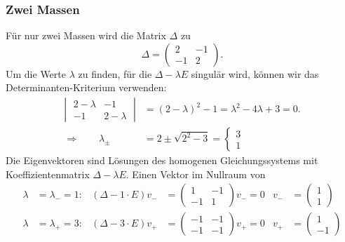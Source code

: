 \subsubsection{Zwei Massen}
Für nur zwei Massen wird die Matrix $\Delta$ zu
\[
\Delta=\begin{pmatrix}
2&-1\\
-1&2
\end{pmatrix}.
\]
Um die Werte $\lambda$ zu finden, für die $\Delta-\lambda E$ singulär
wird, können wir das Determinanten-Kriterium verwenden:
\begin{align*}
\left|\;\begin{matrix}
2-\lambda&-1\\-1&2-\lambda
\end{matrix}\;\right|
&=(2-\lambda)^2-1=\lambda^2 -4\lambda+3=0.
\\
\Rightarrow\qquad
\lambda_{\pm}&=2\pm\sqrt{2^2-3}=\begin{cases}3\\1\end{cases}
\end{align*}
Die Eigenvektoren sind Lösungen des homogenen Gleichungssystems mit
Koeffizientenmatrix $\Delta-\lambda E$.
Einen Vektor im Nullraum
von
\begin{align*}
\lambda&=\lambda_-=1:&
(\Delta -1\cdot E)v_-&=
\begin{pmatrix}
1&-1\\-1&1
\end{pmatrix}v_-=0
&
v_-&=\begin{pmatrix}1\\1\end{pmatrix}
\\
\lambda&=\lambda_+=3:&
(\Delta -3\cdot E)v_+&=
\begin{pmatrix}
-1&-1\\-1&-1
\end{pmatrix}v_+=0
&
v_+&=\begin{pmatrix}1\\-1\end{pmatrix}
\end{align*}
